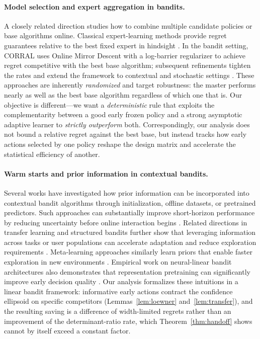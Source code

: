 \documentclass{article}
\theoremstyle{definition}
\theoremstyle{remark}
\theoremstyle{remark}
\begin{document}
\paragraph{Model selection and expert aggregation in bandits.}
A closely related direction studies how to combine multiple candidate
policies or base algorithms online. Classical expert-learning methods provide
regret guarantees relative to the best fixed expert in hindsight
\cite{auer2002nonstochastic}. In the bandit setting, CORRAL
\cite{agarwal2017corralling} uses Online Mirror Descent with a log-barrier
regularizer to achieve regret competitive with the best base algorithm;
subsequent refinements tighten the rates and extend the framework to
contextual and stochastic settings
\cite{pacchiano2020model,marinov2021pareto,zhu2022pareto,zhu2022near,
dann2024data}. These approaches are inherently \emph{randomized} and target
robustness: the master performs nearly as well as the best base algorithm
regardless of which one that is. Our objective is different---we want a
\emph{deterministic} rule that exploits the complementarity between a good
early frozen policy and a strong asymptotic adaptive learner to
\emph{strictly outperform} both. Correspondingly, our analysis does not
bound a relative regret against the best base, but instead tracks how early
actions selected by one policy reshape the design matrix and accelerate the
statistical efficiency of another.

\paragraph{Warm starts and prior information in contextual bandits.}
Several works have investigated how prior information can be incorporated
into contextual bandit algorithms through initialization, offline datasets,
or pretrained predictors. Such approaches can substantially improve
short-horizon performance by reducing uncertainty before online interaction
begins \cite{bastani2021mostly,zhang2019warm}. Related directions in
transfer learning and structured bandits further show that leveraging
information across tasks or user populations can accelerate adaptation and
reduce exploration requirements \cite{lazaric2012transfer,gentile2014online}.
Meta-learning approaches similarly learn priors that enable faster
exploration in new environments \cite{sharaf2019meta}. Empirical work on
neural-linear bandit architectures also demonstrates that representation
pretraining can significantly improve early decision quality
\cite{riquelme2018deep}. Our analysis formalizes these intuitions in a
linear bandit framework: informative early actions contract the confidence
ellipsoid on specific competitors (Lemmas~\ref{lem:loewner}
and~\ref{lem:transfer}), and the resulting saving is a difference of
width-limited regrets rather than an improvement of the
determinant-ratio rate, which Theorem~\ref{thm:handoff} shows cannot by
itself exceed a constant factor.
\end{document}
